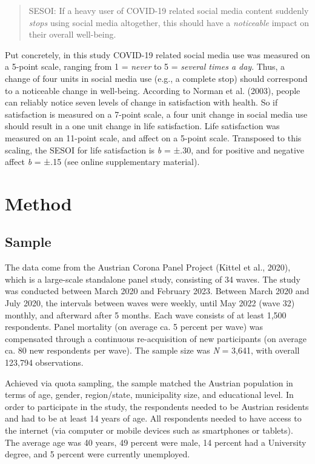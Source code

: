 \documentclass[
  man,mask,floatsintext]{apa7}
\begin{document}
\begin{quote}
SESOI: If a heavy user of COVID-19 related social media content suddenly \emph{stops} using social media altogether, this should have a \emph{noticeable} impact on their overall well-being.
\end{quote}

Put concretely, in this study COVID-19 related social media use was measured on a 5-point scale, ranging from 1 = \emph{never} to 5 = \emph{several times a day}. Thus, a change of four units in social media use (e.g., a complete stop) should correspond to a noticeable change in well-being.
According to Norman et al. (2003), people can reliably notice seven levels of change in satisfaction with health.
So if satisfaction is measured on a 7-point scale, a four unit change in social media use should result in a one unit change in life satisfaction.
Life satisfaction was measured on an 11-point scale, and affect on a 5-point scale.
Transposed to this scaling, the SESOI for life satisfaction is \emph{b} = ±.30, and for positive and negative affect \emph{b} = ±.15 (see online supplementary material).

\section{Method}\label{method}

\subsection{Sample}\label{sample}

The data come from the Austrian Corona Panel Project (Kittel et al., 2020), which is a large-scale standalone panel study, consisting of 34 waves.
The study was conducted between March 2020 and February 2023.
Between March 2020 and July 2020, the intervals between waves were weekly, until May 2022 (wave 32) monthly, and afterward after 5 months.
Each wave consists of at least 1,500 respondents.
Panel mortality (on average ca. 5 percent per wave) was compensated through a continuous re-acquisition of new participants (on average ca. 80 new respondents per wave).
The sample size was \emph{N} = 3,641, with overall 123,794 observations.

Achieved via quota sampling, the sample matched the Austrian population in terms of age, gender, region/state, municipality size, and educational level.
In order to participate in the study, the respondents needed to be Austrian residents and had to be at least 14 years of age.
All respondents needed to have access to the internet (via computer or mobile devices such as smartphones or tablets).
The average age was 40 years, 49 percent were male, 14 percent had a University degree, and 5 percent were currently unemployed.
\end{document}
